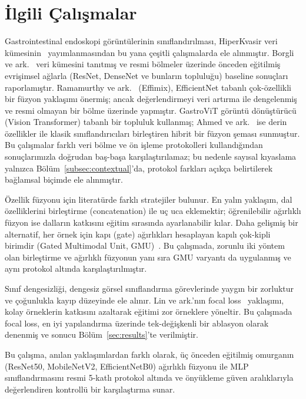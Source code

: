 \section{İlgili Çalışmalar}
\label{sec:related}

Gastrointestinal endoskopi görüntülerinin sınıflandırılması, HiperKvasir veri
kümesinin~\cite{borgli2020hyperkvasir} yayımlanmasından bu yana çeşitli
çalışmalarda ele alınmıştır. Borgli ve ark.~\cite{borgli2020hyperkvasir} veri
kümesini tanıtmış ve resmi bölmeler üzerinde önceden eğitilmiş evrişimsel ağlarla
(ResNet, DenseNet ve bunların topluluğu) baseline sonuçları raporlamıştır.
Ramamurthy ve ark.~\cite{ramamurthy2022effimix} (Effimix), EfficientNet tabanlı
çok-özellikli bir füzyon yaklaşımı önermiş; ancak değerlendirmeyi veri artırma ile
dengelenmiş ve resmi olmayan bir bölme üzerinde yapmıştır. GastroViT
\cite{gastrovit2025} görüntü dönüştürücü (Vision Transformer) tabanlı bir topluluk
kullanmış; Ahmed ve ark.~\cite{ahmed2023hybrid} ise derin özellikler ile klasik
sınıflandırıcıları birleştiren hibrit bir füzyon şeması sunmuştur. Bu çalışmalar
farklı veri bölme ve ön işleme protokolleri kullandığından sonuçlarımızla doğrudan
baş-başa karşılaştırılamaz; bu nedenle sayısal kıyaslama yalnızca
Bölüm~\ref{subsec:contextual}'da, protokol farkları açıkça belirtilerek bağlamsal
biçimde ele alınmıştır.

Özellik füzyonu için literatürde farklı stratejiler bulunur. En yalın yaklaşım,
dal özelliklerini birleştirme (concatenation) ile uç uca eklemektir; öğrenilebilir
ağırlıklı füzyon ise dalların katkısını eğitim sırasında ayarlanabilir kılar. Daha
gelişmiş bir alternatif, her örnek için kapı (gate) ağırlıkları hesaplayan kapılı
çok-kipli birimdir (Gated Multimodal Unit, GMU)~\cite{arevalo2017gmu}. Bu
çalışmada, zorunlu iki yöntem olan birleştirme ve ağırlıklı füzyonun yanı sıra GMU
varyantı da uygulanmış ve aynı protokol altında karşılaştırılmıştır.

Sınıf dengesizliği, dengesiz görsel sınıflandırma görevlerinde yaygın bir zorluktur
ve çoğunlukla kayıp düzeyinde ele alınır. Lin ve ark.'nın focal
loss~\cite{lin2017focal} yaklaşımı, kolay örneklerin katkısını azaltarak eğitimi
zor örneklere yöneltir. Bu çalışmada focal loss, en iyi yapılandırma üzerinde
tek-değişkenli bir ablasyon olarak denenmiş ve sonucu Bölüm~\ref{sec:results}'te
verilmiştir.

Bu çalışma, anılan yaklaşımlardan farklı olarak, üç önceden eğitilmiş omurganın
(ResNet50, MobileNetV2, EfficientNetB0) ağırlıklı füzyonu ile MLP sınıflandırmasını
resmi 5-katlı protokol altında ve önyükleme güven aralıklarıyla değerlendiren
kontrollü bir karşılaştırma sunar.
